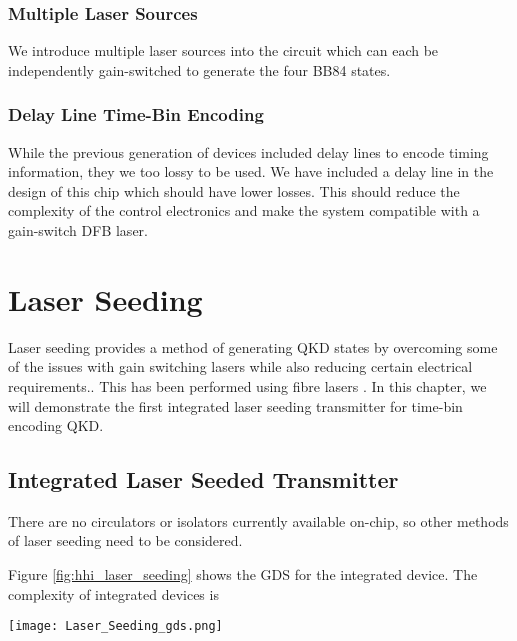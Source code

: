 \subsubsection*{Multiple Laser Sources}

We introduce multiple laser sources into the circuit which can each be independently gain-switched to generate the four BB84 states. 

\subsubsection*{Delay Line Time-Bin Encoding}

While the previous generation of devices included delay lines to encode timing information, they we too lossy to be used. We have included a delay line in the design of this chip which should have lower losses. This should reduce the complexity of the control electronics and make the system compatible with a gain-switch DFB laser.

\section{Laser Seeding}

Laser seeding provides a method of generating \ac{QKD} states by overcoming some of the issues with gain switching lasers while also reducing certain electrical requirements.. This has been performed using fibre lasers \cite{}. In this chapter, we will demonstrate the first integrated laser seeding transmitter for time-bin encoding \ac{QKD}. 

\subsection{Integrated Laser Seeded Transmitter}

There are no circulators or isolators currently available on-chip, so other methods of laser seeding need to be considered.

Figure \ref{fig:hhi_laser_seeding} shows the GDS for the integrated device. The complexity of integrated devices is 

\begin{sidewaysfigure}
	\centering
	\texttt{[image: Laser\_Seeding\_gds.png]}
	\caption[InP laser seeding transmitter with QRNG]{This shows the layout of the laser seeded transmitter device fabricated by HHI. The chip measures \SI[product-units=power]{6x4}{mm} and contains two laser seeding prototype circuits, a homodyne \ac{qrng} and test structure to measure laser and waveguide performances. This demonstrates the complexity and compactness possible in the integrated platform.}
	\label{fig:hhi_laser_seeding}
\end{sidewaysfigure}


